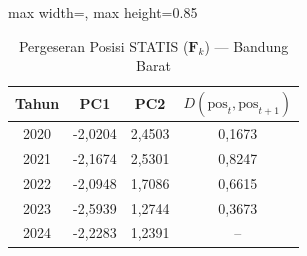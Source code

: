 \begin{table}[H]
\centering
\caption{Pergeseran Posisi STATIS ($\mathbf{F}_k$) --- Bandung Barat} \label{tab:app1jarak_statis_skor_bandung_barat}
\begin{adjustbox}{max width=\textwidth, max height=0.85\textheight}
\begin{tabular}{|c|c|c|c|}
\hline
\textbf{Tahun} & \textbf{PC1} & \textbf{PC2} & \textbf{$D(\text{pos}_t, \text{pos}_{t+1})$} \\
\hline
2020 & -2,0204 & 2,4503 & 0,1673 \\
2021 & -2,1674 & 2,5301 & 0,8247 \\
2022 & -2,0948 & 1,7086 & 0,6615 \\
2023 & -2,5939 & 1,2744 & 0,3673 \\
2024 & -2,2283 & 1,2391 & -- \\
\hline
\end{tabular}
\end{adjustbox}
\end{table}